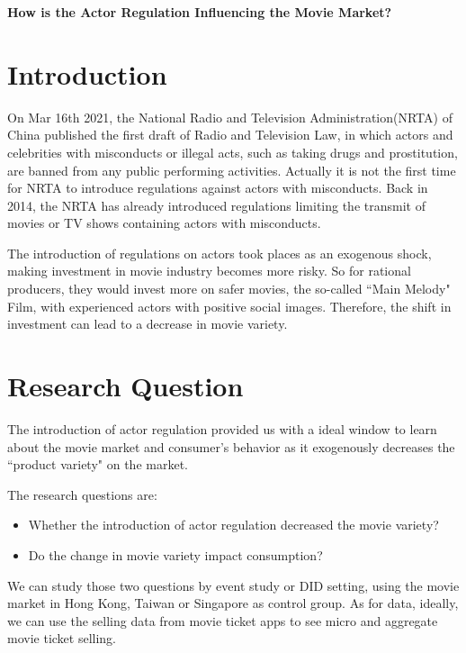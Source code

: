 \documentclass[12pt]{article}
\begin{document}
\begin{center}
    \huge\textbf{How is the Actor Regulation Influencing the Movie Market?}
\end{center}

\section{Introduction}
On Mar 16th 2021, the National Radio and Television Administration(NRTA) of China published the first draft of Radio and Television Law, in which actors and celebrities with misconducts or illegal acts, such as taking drugs and prostitution, are banned from any public performing activities. Actually it is not the first time for NRTA to introduce regulations against actors with misconducts. Back in 2014, the NRTA has already introduced regulations limiting the transmit of movies or TV shows containing actors with misconducts.

The introduction of regulations on actors took places as an exogenous shock, making investment in movie industry becomes more risky. So for rational producers, they would invest more on safer movies, the so-called ``Main Melody" Film, with experienced actors with positive social images. Therefore, the shift in investment can lead to a decrease in movie variety.

\section{Research Question}
The introduction of actor regulation provided us with a ideal window to learn about the movie market and consumer's behavior as it exogenously decreases the ``product variety" on the market.

The research questions are:
\begin{itemize}
\item Whether the introduction of actor regulation decreased the movie variety?
\item Do the change in movie variety impact consumption?
\end{itemize}

We can study those two questions by event study or DID setting, using the movie market in Hong Kong, Taiwan or Singapore as control group. As for data, ideally, we can use the selling data from movie ticket apps to see micro and aggregate movie ticket selling.
\end{document}
